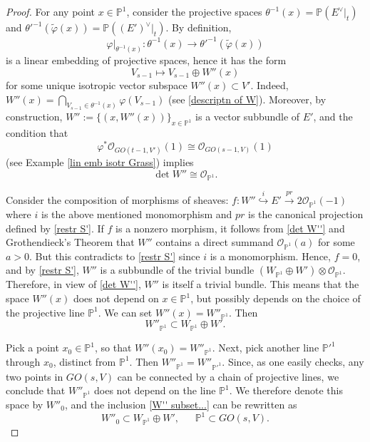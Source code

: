 \documentclass[12pt]{amsart}
\renewcommand{\phi}{\varphi}
\theoremstyle{definition}
\begin{document}
\begin{proof}
For any point $x\in\mathbb{P}^1$, consider the projective 
spaces $\theta^{-1}(x)=\mathbb{P}(E^{\vee}|_t)$ and 
$\theta'^{-1}(\tilde{\phi}(x))=\mathbb{P}((E')^{\vee}|_t)$. By 
definition, $$\phi|_{\theta^{-1}(x)}:\theta^{-1}(x)\to
\theta'^{-1}(\tilde{\phi}(x))$$ is a linear embedding of 
projective spaces, hence it has the form
\begin{equation}\label{new st extn}
V_{s-1}\mapsto V_{s-1}\oplus W''(x)
\end{equation}
for some unique isotropic vector subspace $W''(x)\subset V'$. 
Indeed, $W''(x)=\underset{V_{s-1}
\in\theta^{-1}(x)}{\bigcap} \varphi(V_{s-1})$ (see 
\eqref{descriptn  of W}). Moreover, by construction, 
$W'':=\{(x,W''(x))\}_{x\in\mathbb{P}^1}$ is a vector subbundle 
of $E'$, and the condition that $$\phi^*\mathcal{O}_{GO(t-1,V')}
(1)\cong\mathcal{O}_{GO(s-1,V)}(1)$$ (see Example 
\ref{lin emb isotr Grass}) implies
\begin{equation}\label{det W''}
\det W''\cong\mathcal{O}_{\mathbb{P}^1}.
\end{equation}

Consider the composition of morphisms of sheaves:
$f:W''\stackrel{i}{\hookrightarrow}E'\stackrel{pr}{\to}
2\mathcal{O}_{\mathbb{P}^1}(-1)$ where $i$ is the above 
mentioned monomorphism and $pr$ is the canonical projection
defined by \eqref{restr S'}. If $f$ is a nonzero morphism, it 
follows from \eqref{det W''} and Grothendieck's Theorem that
$W''$ contains a direct summand $\mathcal{O}_{\mathbb{P}^1}
(a)$ for some $a>0$. But this contradicts to \eqref{restr S'}
since $i$ is a monomorphism. Hence, $f=0$, and by
\eqref{restr S'}, $W''$ is a subbundle of the trivial bundle
$(W_{\mathbb{P}^1}\oplus W')\otimes\mathcal{O}_{\mathbb{P}^1}$.
Therefore, in view of \eqref{det W''}, $W''$ is itself a 
trivial bundle. This means that the space $W''(x)$ does not 
depend on $x\in\mathbb{P}^1$, but possibly  depends on 
the choice of the projective line $\mathbb{P}^1$. We can set 
$W''(x)=W''_{\mathbb{P}^1}$. Then
\begin{equation}\label{W'' subset...}
W''_{\mathbb{P}^1}\subset W_{\mathbb{P}^1}\oplus W'.
\end{equation}

Pick a point $x_0\in\mathbb{P}^1$, so that $W''(x_0)=W''
_{\mathbb{P}^1}$. Next, pick another line $\mathbb{P}'^1$ 
through $x_0$, distinct from $\mathbb{P}^1$. Then 
$W''_{\mathbb{P}^1}=W''_{\mathbb{P}'^1}$. 
Since, as one easily checks, any two points in $GO(s,V)$ can be
connected by a chain of projective lines, we conclude that 
$W''_{\mathbb{P}^1}$ does not depend on the line 
$\mathbb{P}^1$. We therefore denote this space by $W''_0$, and 
the inclusion \eqref{W'' subset...} can be rewritten as
\begin{equation}\label{W'' in}
W''_0\subset W_{\mathbb{P}^1}\oplus W',\ \ \ \ \ \ \ 
\mathbb{P}^1\subset GO(s,V).
\end{equation} 


\end{proof}
\end{document}
